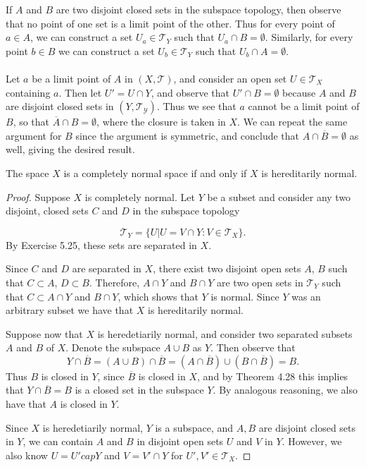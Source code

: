\documentclass[a4paper,12pt,twoside]{hmcpset}
\begin{document}
\begin{solution}
If $A$ and $B$ are two disjoint closed sets in the subspace topology,
then observe that no point of one set is a limit point of the other.
Thus for every point of $a \in A$, we can construct a set $U_a \in
\mathscr{T}_Y$ such that $U_a \cap B = \emptyset.$ Similarly, for
every point $b \in B$ we can construct a set $U_b \in \mathscr{T}_Y$
such that $U_b \cap A = \emptyset.$ \\
\\
Let $a$ be a limit point of $A$ in $(X, \mathscr{T})$, and consider an
open set $U \in \mathscr{T}_X$ containing $a$. Then let $U' = U \cap
Y$, and observe that $U' \cap B = \emptyset$ because $A$ and $B$ are
disjoint closed sets in $(Y, \mathscr{T_Y})$. Thus we see that $a$
cannot be a limit point of $B$, so that $\overline{A}\cap B =
\emptyset$, where the closure is taken in $X$. We can repeat the same
argument for $B$ since the argument is symmetric, and conclude that $A
\cap \overline{B} = \emptyset$ as well, giving the desired result. 
\end{solution}

\begin{problem}[Theorem 5.26]
    The space $X$ is a completely normal space if and only if $X$ is
    hereditarily normal. 
\end{problem}

\begin{proof}
    Suppose $X$ is completely normal. Let $Y$ be a subset and consider
    any two disjoint, closed sets $C$ and $D$ in the subspace topology
    
    \[
        \mathscr{T}_{Y} = \{U | U = V \cap Y : V \in \mathscr{T}_X\}.
    \]
    By Exercise 5.25, these sets are separated in $X$.

    Since $C$ and $D$ are separated in $X$, there exist two disjoint
    open sets $A$, $B$ such that $C \subset A$, $D \subset B$.
    Therefore, $A \cap Y$ and $B \cap Y$ are two open sets in
    $\mathscr{T}_Y$ such that $C \subset A \cap Y$ and $B \cap Y$,
    which shows that $Y$ is normal. Since $Y$ was an arbitrary subset
    we have that $X$ is hereditarily normal.

    Suppose now that $X$ is heredetiarily normal, and consider two
    separated subsets $A$ and $B$ of $X$. Denote the subspace $A \cup
    B$ as $Y$. Then observe that 
    \[ 
        Y \cap \overline{B} = (A \cup B) \cap \overline{B} 
        = (A \cap \overline{B}) \cup (B \cap \overline{B}) = B.
    \]
    Thus $B$ is closed in $Y$, since
    $\overline{B}$ is closed in $X$, and by Theorem 4.28 this implies
    that $Y \cap \overline{B} = B$ is a closed set in the subspace
    $Y$. By analogous reasoning, we also have that $A$ is closed in
    $Y$.

    Since $X$ is heredetiarily normal, $Y$ is a subspace, and 
    $A, B$ are disjoint closed sets in $Y$, we can contain $A$ and $B$
    in disjoint open sets $U$ and $V$ in $Y$. However, we also know
    $U = U' cap Y$ and $V = V' \cap Y$ for $U', V' 
    \in \mathscr{T}_X$.
\end{proof}
\end{document}

